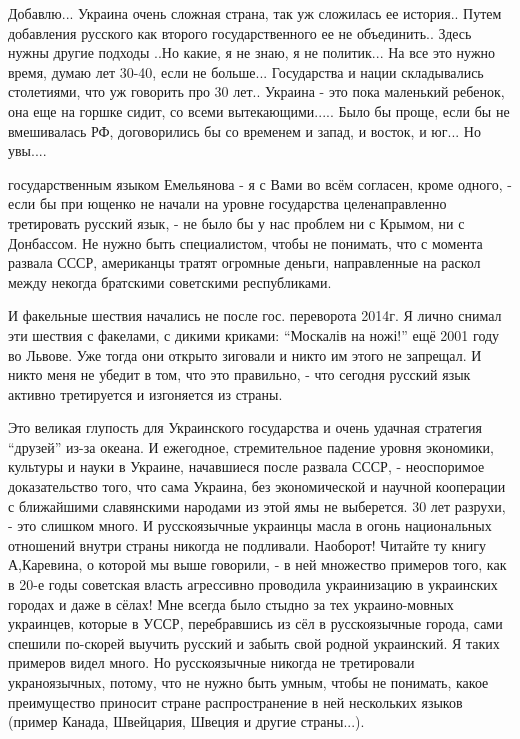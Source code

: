 \begin{itemize}
\begin{itemize}
\begin{itemize}

Добавлю... Украина очень сложная страна, так уж сложилась ее история.. Путем
добавления русского как второго государственного ее не объединить.. Здесь нужны
другие подходы ..Но какие, я не знаю, я не политик... На все это нужно время,
думаю лет 30-40, если не больше... Государства и нации складывались столетиями,
что уж говорить про 30 лет.. Украина - это пока маленький ребенок, она еще на
горшке сидит, со всеми вытекающими..... Было бы проще, если бы не вмешивалась
РФ, договорились бы со временем и запад, и восток, и юг... Но увы....


государственным языком Емельянова - я с Вами во всём согласен, кроме одного, -
если бы при ющенко не начали на уровне государства целенаправленно третировать
русский язык, - не было бы у нас проблем ни с Крымом, ни с Донбассом. Не нужно
быть специалистом, чтобы не понимать, что с момента развала СССР, американцы
тратят огромные деньги, направленные на раскол между некогда братскими
советскими республиками. 

И факельные шествия начались не после гос. переворота
2014г. Я лично снимал эти шествия с факелами, с дикими криками: \enquote{Москалів на
ножі!} ещё 2001 году во Львове. Уже тогда они открыто зиговали и никто им этого
не запрещал. И никто меня не убедит в том, что это правильно, - что сегодня
русский язык активно третируется и изгоняется из страны. 

Это великая глупость
для Украинского государства и очень удачная стратегия \enquote{друзей} из-за
океана. И ежегодное, стремительное падение уровня экономики, культуры и науки в
Украине, начавшиеся после развала СССР, - неоспоримое доказательство того, что
сама Украина, без экономической и научной кооперации с ближайшими славянскими
народами из этой ямы не выберется. 30 лет разрухи, - это слишком много. И
русскоязычные украинцы масла в огонь национальных отношений внутри страны
никогда не подливали. Наоборот! Читайте ту книгу А,Каревина, о которой мы выше
говорили, - в ней множество примеров того, как в 20-е годы советская власть
агрессивно проводила украинизацию в украинских городах и даже в сёлах! Мне
всегда было стыдно за тех украино-мовных украинцев, которые в УССР,
перебравшись из сёл в русскоязычные города, сами спешили по-скорей выучить
русский и забыть свой родной украинский. Я таких примеров видел много. Но
русскоязычные никогда не третировали украноязычных, потому, что не нужно быть
умным, чтобы не понимать, какое преимущество приносит стране распространение в
ней нескольких языков (пример Канада, Швейцария, Швеция и другие страны...).


\end{itemize}
\end{itemize}
\end{itemize}
